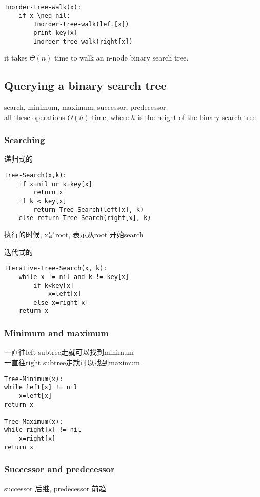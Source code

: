 \documentclass{article}
\begin{document}
\begin{verbatim}
Inorder-tree-walk(x):
    if x \neq nil:
        Inorder-tree-walk(left[x])
        print key[x]
        Inorder-tree-walk(right[x])
\end{verbatim}

it takes $\Theta(n)$ time to walk an n-node binary search tree.

\subsection{Querying a binary search tree}
search, minimum, maximum, successor, predecessor\\
all these operations $\Theta(h)$ time, where $h$ is the height of the binary search tree

\subsubsection{Searching}
递归式的
\begin{verbatim}
Tree-Search(x,k):
    if x=nil or k=key[x]
        return x
    if k < key[x]
        return Tree-Search(left[x], k)
    else return Tree-Search(right[x], k)
\end{verbatim}
执行的时候, x是root, 表示从root 开始search

迭代式的
\begin{verbatim}
Iterative-Tree-Search(x, k):
    while x != nil and k != key[x]
        if k<key[x]
            x=left[x]
        else x=right[x]
    return x
\end{verbatim}

\subsubsection{Minimum and maximum}
\noindent 一直往left subtree走就可以找到minimum\\
一直往right subtree走就可以找到maximum

\begin{verbatim}
Tree-Minimum(x):
while left[x] != nil
    x=left[x]
return x

Tree-Maximum(x):
while right[x] != nil
    x=right[x]
return x
\end{verbatim}

\subsubsection{Successor and predecessor}
successor 后继,
predecessor 前趋
\end{document}
